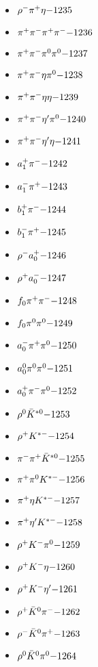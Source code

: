 \begin{multicols}{3}
\begin{itemize}
 \item $ \rho^{-} \pi^{+} \eta \hfill{-1235}$
 \item $ \pi^{+} \pi^{-} \pi^{+} \pi^{-} \hfill{-1236}$
 \item $ \pi^{+} \pi^{-} \pi^{0} \pi^{0} \hfill{-1237}$
 \item $ \pi^{+} \pi^{-} \eta \pi^{0} \hfill{-1238}$
 \item $ \pi^{+} \pi^{-} \eta \eta \hfill{-1239}$
 \item $ \pi^{+} \pi^{-} {\eta^{\prime}} \pi^{0} \hfill{-1240}$
 \item $ \pi^{+} \pi^{-} {\eta^{\prime}} \eta \hfill{-1241}$
 \item $ a_{1}^{+} \pi^{-} \hfill{-1242}$
 \item $ a_{1}^{-} \pi^{+} \hfill{-1243}$
 \item $ b_{1}^{+} \pi^{-} \hfill{-1244}$
 \item $ b_{1}^{-} \pi^{+} \hfill{-1245}$
 \item $ \rho^{-} a_{0}^{+} \hfill{-1246}$
 \item $ \rho^{+} a_{0}^{-} \hfill{-1247}$
 \item $ f_{0} \pi^{+} \pi^{-} \hfill{-1248}$
 \item $ f_{0} \pi^{0} \pi^{0} \hfill{-1249}$
 \item $ a_{0}^{-} \pi^{+} \pi^{0} \hfill{-1250}$
 \item $ a_{0}^{0} \pi^{0} \pi^{0} \hfill{-1251}$
 \item $ a_{0}^{+} \pi^{-} \pi^{0} \hfill{-1252}$
 \item $ \rho^{0} \bar{K}^{*0} \hfill{-1253}$
 \item $ \rho^{+} K^{*-} \hfill{-1254}$
 \item $ \pi^{-} \pi^{+} \bar{K}^{*0} \hfill{-1255}$
 \item $ \pi^{+} \pi^{0} K^{*-} \hfill{-1256}$
 \item $ \pi^{+} \eta K^{*-} \hfill{-1257}$
 \item $ \pi^{+} {\eta^{\prime}} K^{*-} \hfill{-1258}$
 \item $ \rho^{+} K^{-} \pi^{0} \hfill{-1259}$
 \item $ \rho^{+} K^{-} \eta \hfill{-1260}$
 \item $ \rho^{+} K^{-} {\eta^{\prime}} \hfill{-1261}$
 \item $ \rho^{+} \bar{K}^{0} \pi^{-} \hfill{-1262}$
 \item $ \rho^{-} \bar{K}^{0} \pi^{+} \hfill{-1263}$
 \item $ \rho^{0} \bar{K}^{0} \pi^{0} \hfill{-1264}$

\end{itemize}
\end{multicols}
